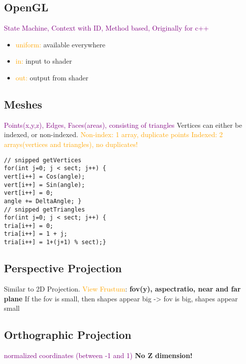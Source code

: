 \documentclass[main.tex,fontsize=12pt,paper=a4,paper=landscape,DIV=calc,]{scrartcl}
\begin{document}
\begin{multicols*}{4}
\section{OpenGL}
 \textcolor{purple}{State Machine, Context with ID, \newline Method based, Originally for c++}
\begin{itemize}
\item \textcolor{orange}{uniform:} available everywhere
\item \textcolor{orange}{in:} input to shader
\item \textcolor{orange}{out: } output from shader
\end{itemize} 

\subsection{Meshes}
\textcolor{purple}{Points(x,y,z), Edges, Faces(areas), consisting of triangles}
Vertices can either be indexed, or non-indexed.\newline
\textcolor{orange}{Non-index: 1 array, duplicate points}\newline
\textcolor{orange}{Indexed: 2 arrays(vertices and triangles), no duplicates!}\newline
\begin{lstlisting}
// snipped getVertices
for(int j=0; j < sect; j++) {
vert[i++] = Cos(angle);
vert[i++] = Sin(angle);
vert[i++] = 0;
angle += DeltaAngle; }
// snipped getTriangles
for(int j=0; j < sect; j++) {
tria[i++] = 0;
tria[i++] = 1 + j;
tria[i++] = 1+(j+1) % sect);}
\end{lstlisting}

\subsection{Perspective Projection}
Similar to 2D Projection. \newline
\textcolor{orange}{View Frustum}: \newline
\textbf{fov(y), aspectratio, near and far plane}\newline
\textcolor{OliveGreen}{If the fov is small, then shapes appear big -> fov is big, shapes appear small}

\subsection{Orthographic Projection}
\textcolor{purple}{normalized coordinates (between -1 and 1)} \textbf{No Z dimension!}


\end{multicols*}
\end{document}
